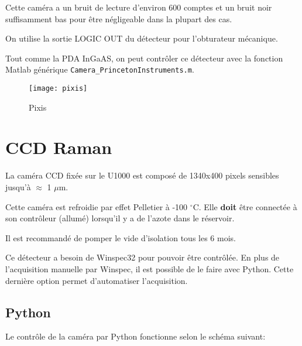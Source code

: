 \documentclass[11pt,francais]{book} %
\begin{document}
Cette caméra a un bruit de lecture d'environ 600 comptes et un bruit noir suffisamment bas pour être négligeable dans la plupart des cas.

On utilise la sortie LOGIC OUT du détecteur pour l'obturateur mécanique.

Tout comme la PDA InGaAS, on peut contrôler ce détecteur avec la fonction Matlab générique \verb!Camera_PrincetonInstruments.m!.

\begin{figure}[htbp]
  \centering\texttt{[image: pixis]}
  \caption{Pixis}
  \label{fig:pixis}
\end{figure}



\section{CCD Raman}

La caméra CCD fixée sur le U1000 est composé de 1340x400 pixels sensibles jusqu'à $\approx$ 1 $\mu$m.

Cette caméra est refroidie par effet Pelletier à -100 $^{\circ}$C.
Elle {\bf doit} être connectée à son contrôleur (allumé) lorsqu'il y a de l'azote dans le réservoir.

Il est recommandé de pomper le vide d'isolation tous les 6 mois.

Ce détecteur a besoin de Winspec32 pour pouvoir être contrôlée.
En plus de l'acquisition manuelle par Winspec, il est possible de le faire avec Python.
Cette dernière option permet d'automatiser l'acquisition.

\subsection{Python}

Le contrôle de la caméra par Python fonctionne selon le schéma suivant: 
\begin{center}
\end{center}
\end{document}
